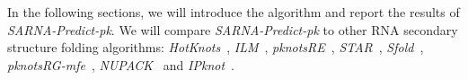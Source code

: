 \documentclass{doublecol-new}
\theoremstyle{TH}{
\newtheorem{lemma}{Lemma}
\newtheorem{theorem}[lemma]{Theorem}
\newtheorem{corrolary}[lemma]{Corrolary}
\newtheorem{conjecture}[lemma]{Conjecture}
\newtheorem{proposition}[lemma]{Proposition}
\newtheorem{claim}[lemma]{Claim}
\newtheorem{stheorem}[lemma]{Wrong Theorem}
\newtheorem{algorithm}{Algorithm}
}
\theoremstyle{THrm}{
\newtheorem{definition}{Definition}
\newtheorem{question}{Question}
\newtheorem{remark}{Remark}
\newtheorem{scheme}{Scheme}
}
\theoremstyle{THhit}{
\newtheorem{case}{Case}[section]
}
\begin{document}
\medskip
%
In the following sections, we will introduce the algorithm and report the results 
of {\em SARNA-Predict-pk}.
We will compare 
{\em SARNA-Predict-pk} to other  RNA secondary structure folding algorithms:
{\em HotKnots}~\cite{ren_2005}, {\em ILM}~\cite{ruan_2004}, 
{\em pknotsRE}~\cite{rivas99dynamic}, {\em STAR}~\cite{gultyaev_1995},
{\em Sfold}~\cite{chan_2005},
{\em pknotsRG-mfe}~\cite{reeder_2004}, {\em NUPACK}~\cite{dirks_2003} and 
{\em IPknot}~\cite{sato_2011}.
\end{document}
